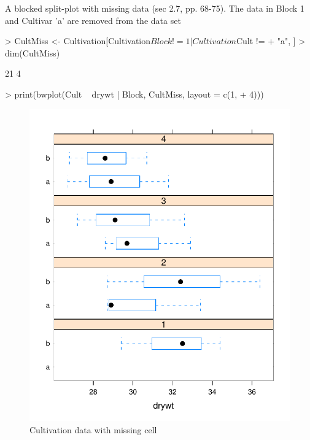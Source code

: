 \documentclass[12pt]{article}
\begin{document}
A blocked split-plot with missing data (sec 2.7, pp. 68-75).  The data
in Block 1 and Cultivar 'a' are removed from the data set

\begin{Schunk}
\begin{Sinput}
> CultMiss <- Cultivation[Cultivation$Block != 1 | Cultivation$Cult != 
+     "a", ]
> dim(CultMiss)
\end{Sinput}
\begin{Soutput}
[1] 21  4
\end{Soutput}
\end{Schunk}
\begin{Schunk}
\begin{Sinput}
> print(bwplot(Cult ~ drywt | Block, CultMiss, layout = c(1, 
+     4)))
\end{Sinput}
\end{Schunk}
\begin{figure}[tbp]
  \centering
  \includegraphics{figs/f-cultm1}
  \caption{Cultivation data with missing cell}
  \label{fig:adg1}
\end{figure}
\end{document}
